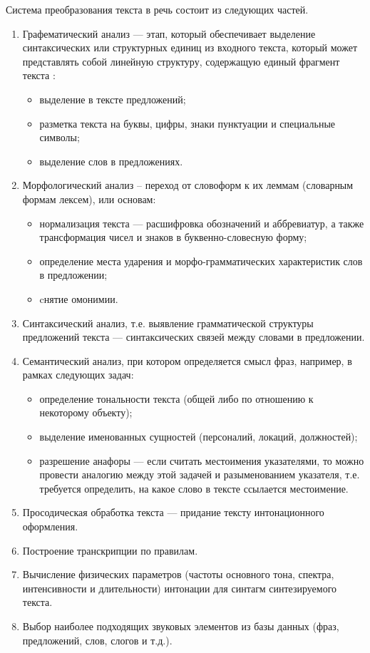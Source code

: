 Система преобразования текста в речь состоит из следующих частей.
\begin{enumerate}
\item Графематический анализ --- этап, который обеспечивает выделение синтаксических или структурных единиц из входного текста, который может представлять собой линейную структуру, содержащую единый фрагмент текста \cite{graph}:
\begin{itemize}[label=---]
	\item выделение в тексте предложений;
	\item разметка текста на буквы, цифры, знаки пунктуации и специальные символы;
	\item выделение слов в предложениях.
\end{itemize}
\item Морфологический анализ – переход от словоформ к их леммам (словарным
формам лексем), или основам:
\begin{itemize}[label=---]
	\item нормализация текста --- расшифровка обозначений и аббревиатур, а также трансформация чисел и знаков в буквенно-словесную форму;
	\item определение места ударения и морфо-грамматических характеристик слов в предложении;
	\item cнятие омонимии.
\end{itemize}
\item Синтаксический анализ, т.е. выявление грамматической структуры предложений
текста --- синтаксических связей между словами в предложении.
\item Семантический анализ, при котором определяется смысл фраз, например, в рамках следующих задач:
\begin{itemize}[label=---]
	\item определение тональности текста (общей либо по отношению к некоторому объекту);
	\item выделение именованных сущностей (персоналий, локаций, должностей);
	\item  разрешение анафоры --- если считать местоимения указателями, то можно провести аналогию между этой задачей и разыменованием указателя, т.е. требуется определить, на какое слово в тексте ссылается местоимение.
\end{itemize}
\item Просодическая обработка текста --- придание тексту интонационного оформления.
\item Построение транскрипции по правилам.
\item Вычисление физических параметров (частоты основного тона, спектра, интенсивности и длительности) интонации для синтагм синтезируемого текста.
\item Выбор наиболее подходящих звуковых элементов из базы данных (фраз, предложений, слов, слогов и т.д.).
\end{enumerate}

